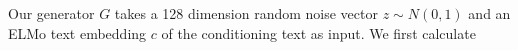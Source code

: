 Our generator $G$ takes a 128 dimension random noise vector $z \sim N(0, 1)$ and an ELMo text embedding $c$ of the conditioning text as input. We first calculate %